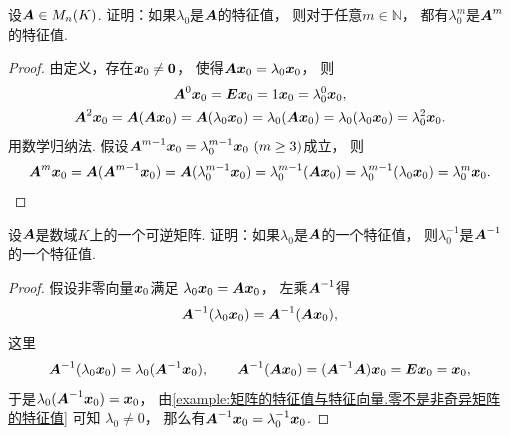 \begin{example}\label{example:矩阵的特征值与特征向量.矩阵的多项式的特征值2}
设\(\boldsymbol{A} \in M_n(K)\).
证明：如果\(\lambda_0\)是\(\boldsymbol{A}\)的特征值，
则对于任意\(m\in\mathbb{N}\)，
都有\(\lambda_0^m\)是\(\boldsymbol{A}^m\)的特征值.
\begin{proof}
由定义，存在\(\boldsymbol{x}_0\neq\boldsymbol0\)，
使得\(\boldsymbol{A}\boldsymbol{x}_0 = \lambda_0\boldsymbol{x}_0\)，
则\begin{gather*}
	\boldsymbol{A}^0 \boldsymbol{x}_0
	= \boldsymbol{E} \boldsymbol{x}_0
	= 1 \boldsymbol{x}_0
	= \lambda_0^0 \boldsymbol{x}_0, \\
	\boldsymbol{A}^2\boldsymbol{x}_0 = \boldsymbol{A}(\boldsymbol{A}\boldsymbol{x}_0)
	= \boldsymbol{A}(\lambda_0\boldsymbol{x}_0)
	= \lambda_0(\boldsymbol{A}\boldsymbol{x}_0)
	= \lambda_0(\lambda_0\boldsymbol{x}_0)
	= \lambda_0^2\boldsymbol{x}_0.
\end{gather*}
用数学归纳法.
假设\(\vb{A}^{m-1}\vb{x}_0 = \lambda_0^{m-1}\vb{x}_0\ (m\geq3)\)成立，
则\begin{equation*}
	\boldsymbol{A}^m\boldsymbol{x}_0 = \boldsymbol{A}(\boldsymbol{A}^{m-1}\boldsymbol{x}_0)
	= \boldsymbol{A}(\lambda_0^{m-1}\boldsymbol{x}_0)
	= \lambda_0^{m-1}(\boldsymbol{A}\boldsymbol{x}_0)
	= \lambda_0^{m-1}(\lambda_0\boldsymbol{x}_0)
	= \lambda_0^m\boldsymbol{x}_0.
	\qedhere
\end{equation*}
\end{proof}
\end{example}
\begin{example}\label{example:矩阵的特征值与特征向量.矩阵的多项式的特征值3}
设\(\boldsymbol{A}\)是数域\(K\)上的一个可逆矩阵.
证明：如果\(\lambda_0\)是\(\boldsymbol{A}\)的一个特征值，
则\(\lambda_0^{-1}\)是\(\boldsymbol{A}^{-1}\)的一个特征值.
\begin{proof}
假设非零向量\(\boldsymbol{x}_0\)满足
\(\lambda_0 \boldsymbol{x}_0 = \boldsymbol{A} \boldsymbol{x}_0\)，
左乘\(\boldsymbol{A}^{-1}\)得\begin{equation*}
	\boldsymbol{A}^{-1} (\lambda_0 \boldsymbol{x}_0)
	= \boldsymbol{A}^{-1} (\boldsymbol{A} \boldsymbol{x}_0),
\end{equation*}
这里\begin{equation*}
	\boldsymbol{A}^{-1} (\lambda_0 \boldsymbol{x}_0)
	= \lambda_0 (\boldsymbol{A}^{-1} \boldsymbol{x}_0),
	\qquad
	\boldsymbol{A}^{-1} (\boldsymbol{A} \boldsymbol{x}_0)
	= (\boldsymbol{A}^{-1} \boldsymbol{A}) \boldsymbol{x}_0
	= \boldsymbol{E} \boldsymbol{x}_0
	= \boldsymbol{x}_0,
\end{equation*}
于是\(\lambda_0 (\boldsymbol{A}^{-1} \boldsymbol{x}_0) = \boldsymbol{x}_0\)，
由\cref{example:矩阵的特征值与特征向量.零不是非奇异矩阵的特征值} 可知
\(\lambda_0 \neq 0\)，
那么有\(\boldsymbol{A}^{-1} \boldsymbol{x}_0 = \lambda_0^{-1} \boldsymbol{x}_0\).
\end{proof}
\end{example}
